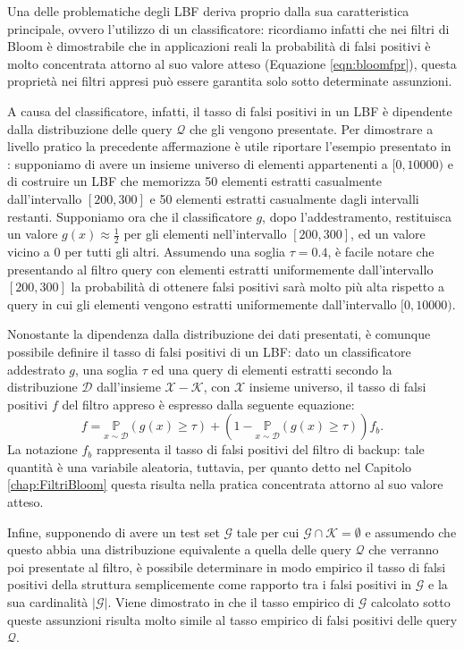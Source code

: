 \documentclass[../../main.tex]{subfiles}
\begin{document}
    
    Una delle problematiche degli LBF deriva proprio dalla sua caratteristica principale, ovvero l'utilizzo di un classificatore: ricordiamo infatti che nei filtri di Bloom è dimostrabile che in applicazioni reali la probabilità di falsi positivi è molto concentrata attorno al suo valore atteso (Equazione \eqref{eqn:bloomfpr}), questa proprietà nei filtri appresi può essere garantita solo sotto determinate assunzioni.

    A causa del classificatore, infatti, il tasso di falsi positivi in un LBF è dipendente dalla distribuzione delle query $\mathcal{Q}$ che gli vengono presentate. Per dimostrare a livello pratico la precedente affermazione è utile riportare l'esempio presentato in \cite{10.5555/3326943.3326986}: supponiamo di avere un insieme universo di elementi appartenenti a $[0, 10000)$ e di costruire un LBF che memorizza 50 elementi estratti casualmente dall'intervallo $[200,300]$ e 50 elementi estratti casualmente dagli intervalli restanti. Supponiamo ora che il classificatore $g$, dopo l'addestramento, restituisca un valore $g(x) \approx \frac{1}{2}$ per gli elementi nell'intervallo $[200,300]$, ed un valore vicino a 0 per tutti gli altri. Assumendo una soglia $\tau = 0.4$, è facile notare che presentando al filtro query con elementi estratti uniformemente dall'intervallo $[200,300]$ la probabilità di ottenere falsi positivi sarà molto più alta rispetto a query in cui gli elementi vengono estratti uniformemente dall'intervallo $[0, 10000)$.

    Nonostante la dipendenza dalla distribuzione dei dati presentati, è comunque possibile definire il tasso di falsi positivi di un LBF: dato un classificatore addestrato $g$, una soglia $\tau$ ed una query di elementi estratti secondo la distribuzione $\mathcal{D}$ dall'insieme $\mathcal{X} - \mathcal{K}$, con $\mathcal{X}$ insieme universo, il tasso di falsi positivi $f$ del filtro appreso è espresso dalla seguente equazione:
    \begin{equation}
        f = \underset{x \sim \mathcal{D}}{\mathbb{P}}(g(x) \geq \tau) + (1 - \underset{x \sim \mathcal{D}}{\mathbb{P}}(g(x) \geq \tau))f_b.
        \label{eqn:LBFFalsiPositivi}
    \end{equation} 
    La notazione $f_b$ rappresenta il tasso di falsi positivi del filtro di backup: tale quantità è una variabile aleatoria, tuttavia, per quanto detto nel Capitolo \ref{chap:FiltriBloom} questa risulta nella pratica concentrata attorno al suo valore atteso.

    Infine, supponendo di avere un test set $\mathcal{G}$ tale per cui $\mathcal{G} \cap \mathcal{K} = \emptyset$ e assumendo che questo abbia una distribuzione equivalente a quella delle query $\mathcal{Q}$ che verranno poi presentate al filtro, è possibile determinare in modo empirico il tasso di falsi positivi della struttura semplicemente come rapporto tra i falsi positivi in $\mathcal{G}$ e la sua cardinalità $|\mathcal{G}|$. Viene dimostrato in \cite{10.5555/3326943.3326986} che il tasso empirico di $\mathcal{G}$ calcolato sotto queste assunzioni risulta molto simile al tasso empirico di falsi positivi delle query $\mathcal{Q}$. 
    
\end{document}
